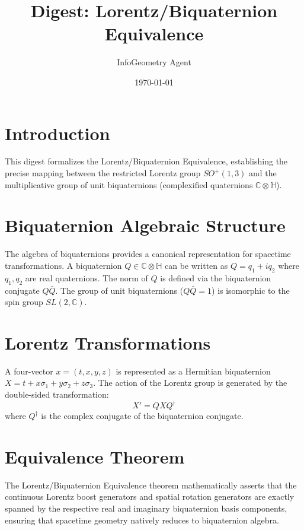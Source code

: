 \documentclass{article}
\title{Digest: Lorentz/Biquaternion Equivalence}
\author{InfoGeometry Agent}
\date{\today}
\begin{document}
\maketitle

\section{Introduction}
This digest formalizes the Lorentz/Biquaternion Equivalence, establishing the precise mapping between the restricted Lorentz group $SO^+(1,3)$ and the multiplicative group of unit biquaternions (complexified quaternions $\mathbb{C} \otimes \mathbb{H}$).

\section{Biquaternion Algebraic Structure}
The algebra of biquaternions provides a canonical representation for spacetime transformations. A biquaternion $Q \in \mathbb{C} \otimes \mathbb{H}$ can be written as $Q = q_1 + i q_2$ where $q_1, q_2$ are real quaternions.
The norm of $Q$ is defined via the biquaternion conjugate $Q \bar{Q}$. The group of unit biquaternions ($Q \bar{Q} = 1$) is isomorphic to the spin group $SL(2, \mathbb{C})$.

\section{Lorentz Transformations}
A four-vector $x = (t, x, y, z)$ is represented as a Hermitian biquaternion $X = t + x \sigma_1 + y \sigma_2 + z \sigma_3$.
The action of the Lorentz group is generated by the double-sided transformation:
\begin{equation}
X' = Q X Q^\dagger
\end{equation}
where $Q^\dagger$ is the complex conjugate of the biquaternion conjugate.

\section{Equivalence Theorem}
The Lorentz/Biquaternion Equivalence theorem mathematically asserts that the continuous Lorentz boost generators and spatial rotation generators are exactly spanned by the respective real and imaginary biquaternion basis components, ensuring that spacetime geometry natively reduces to biquaternion algebra.
\end{document}
